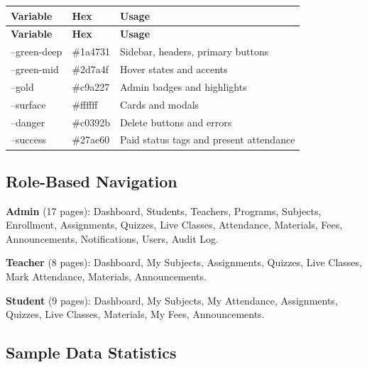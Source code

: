 \documentclass[12pt,a4paper]{report}
\begin{document}
\begin{longtable}{|L{3.5cm}|C{2.5cm}|L{8cm}|}
\hline
\textbf{Variable} & \textbf{Hex} & \textbf{Usage} \\
\hline
\endfirsthead
\hline
\textbf{Variable} & \textbf{Hex} & \textbf{Usage} \\
\hline
\endhead
--green-deep & \#1a4731 & Sidebar, headers, primary buttons \\
\hline
--green-mid & \#2d7a4f & Hover states and accents \\
\hline
--gold & \#c9a227 & Admin badges and highlights \\
\hline
--surface & \#ffffff & Cards and modals \\
\hline
--danger & \#c0392b & Delete buttons and errors \\
\hline
--success & \#27ae60 & Paid status tags and present attendance \\
\hline
\end{longtable}

\subsection{Role-Based Navigation}

\textbf{Admin} (17 pages): Dashboard, Students, Teachers, Programs, Subjects, Enrollment, Assignments, Quizzes, Live Classes, Attendance, Materials, Fees, Announcements, Notifications, Users, Audit Log.

\textbf{Teacher} (8 pages): Dashboard, My Subjects, Assignments, Quizzes, Live Classes, Mark Attendance, Materials, Announcements.

\textbf{Student} (9 pages): Dashboard, My Subjects, My Attendance, Assignments, Quizzes, Live Classes, Materials, My Fees, Announcements.

\subsection{Sample Data Statistics}
\end{document}
